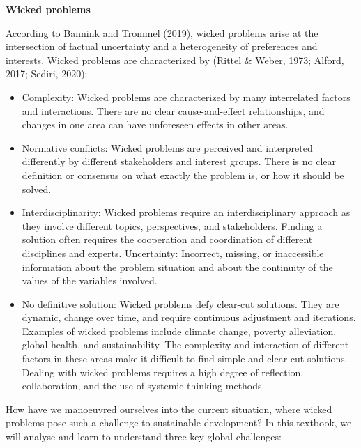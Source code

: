 \documentclass[
  letterpaper,
  DIV=11,
  numbers=noendperiod]{scrreprt}
\begin{document}
\begin{tcolorbox}[enhanced jigsaw, toprule=.15mm, breakable, opacityback=0, arc=.35mm, colback=white, rightrule=.15mm, bottomrule=.15mm, colframe=quarto-callout-note-color-frame, left=2mm, leftrule=.75mm]

\vspace{-3mm}\textbf{Wicked problems}\vspace{3mm}

According to Bannink and Trommel (2019), wicked problems arise at the
intersection of factual uncertainty and a heterogeneity of preferences
and interests. Wicked problems are characterized by (Rittel \& Weber,
1973; Alford, 2017; Sediri, 2020):

\begin{itemize}
\item
  Complexity: Wicked problems are characterized by many interrelated
  factors and interactions. There are no clear cause-and-effect
  relationships, and changes in one area can have unforeseen effects in
  other areas.
\item
  Normative conflicts: Wicked problems are perceived and interpreted
  differently by different stakeholders and interest groups. There is no
  clear definition or consensus on what exactly the problem is, or how
  it should be solved.
\item
  Interdisciplinarity: Wicked problems require an interdisciplinary
  approach as they involve different topics, perspectives, and
  stakeholders. Finding a solution often requires the cooperation and
  coordination of different disciplines and experts. Uncertainty:
  Incorrect, missing, or inaccessible information about the problem
  situation and about the continuity of the values of the variables
  involved.
\item
  No definitive solution: Wicked problems defy clear-cut solutions. They
  are dynamic, change over time, and require continuous adjustment and
  iterations. Examples of wicked problems include climate change,
  poverty alleviation, global health, and sustainability. The complexity
  and interaction of different factors in these areas make it difficult
  to find simple and clear-cut solutions. Dealing with wicked problems
  requires a high degree of reflection, collaboration, and the use of
  systemic thinking methods.
\end{itemize}

\end{tcolorbox}

How have we manoeuvred ourselves into the current situation, where
wicked problems pose such a challenge to sustainable development? In
this textbook, we will analyse and learn to understand three key global
challenges:
\end{document}
